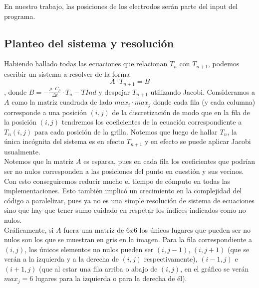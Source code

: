\documentclass[a4paper]{article}
\begin{document}
En nuestro trabajo, las posiciones de los electrodos serán parte del input del programa.

\subsection{Planteo del sistema y resolución}

Habiendo hallado todas las ecuaciones que relacionan $T_n$ con $T_{n+1}$, 
podemos escribir un sistema a resolver de la forma $$A \cdot T_{n+1} = B$$, donde $B = -\frac{\rho \cdot C_\rho}{\Delta t} \cdot T_n - TInd$ y 
despejar $T_{n+1}$ utilizando Jacobi. Consideramos a $A$ como la matriz 
cuadrada de lado $max_i \cdot max_j$ donde cada fila (y cada columna) corresponde a 
una posición $(i, j)$ de la discretización de modo que en la fila de la 
posición $(i, j)$ tendremos los coeficientes de la ecuación correspondiente 
a $T_n(i,j)$ para cada posición de la grilla. Notemos que luego de hallar $T_n$, 
la única incógnita del sistema es en efecto $T_{n+1}$ y en efecto se puede aplicar Jacobi usualmente.\\

Notemos que la matriz $A$ es esparsa, pues en cada fila los coeficientes 
que podrían ser no nulos corresponden a las posiciones del punto en 
cuestión y sus vecinos. Con esto conseguiremos reducir mucho el tiempo 
de cómputo en todas las implementaciones. Esto también implicó un crecimiento
en la complejidad del código a paralelizar, pues ya no es una simple resolución
de sistema de ecuaciones sino que hay que tener sumo cuidado en respetar
los índices indicados como no nulos. \\

Gráficamente, si $A$ fuera una matriz de $6x6$ los únicos lugares que pueden
ser no nulos son los que se muestran en gris en la imagen. Para la fila 
correspondiente a $(i,j)$, los únicos elementos no nulos pueden ser $(i, j-1)$, 
$(i,j+1)$ (que se verán a la izquierda y a la derecha de $(i,j)$ respectivamente), 
$(i-1, j)$ e $(i+1,j)$ (que al estar una fila arriba o abajo de $(i,j)$, 
en el gráfico se verán $max_j = 6$ lugares para la izquierda o para la derecha de él). 
\end{document}
